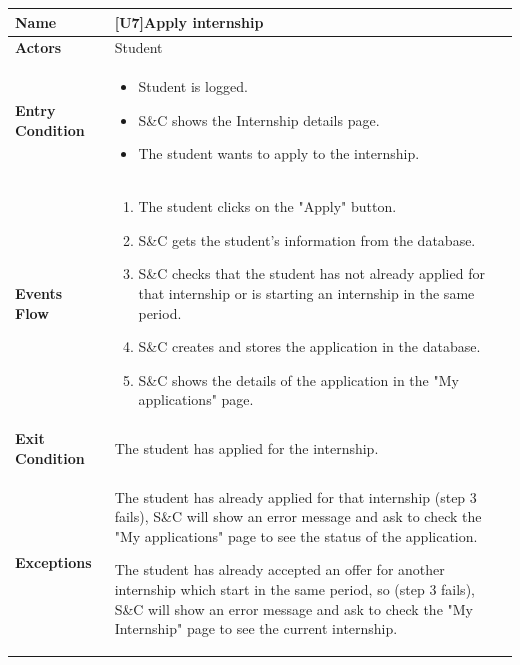 \begin{center}
    \begin{tabular}{|p{9em}|p{27em}|}
        \hline
        \rowcolor{bluepoli!40}
        \textbf{Name} & \textbf{[U7]Apply internship} \\
        \hline
        \textbf{Actors} & Student \\
        \hline
        \textbf{Entry Condition} & 
        \begin{itemize}
            \item Student is logged.
            \item S\&C shows the Internship details page.
            \item The student wants to apply to the internship.
        \end{itemize} \\
        \hline
        \textbf{Events Flow} & 
        \begin{enumerate}
            \item The student clicks on the "Apply" button.
            \item S\&C gets the student's information from the database.
            \item S\&C checks that the student has not already applied for that internship or is starting an internship in the same period.
            \item S\&C creates and stores the application in the database.
            \item S\&C shows the details of the application in the "My applications" page.
        \end{enumerate} \\
        \hline
        \textbf{Exit Condition} & The student has applied for the internship. \\
        \hline
        \textbf{Exceptions} & The student has already applied for that internship (step 3 fails), S\&C will show an error message and ask to
        check the "My applications" page to see the status of the application. 
        
        The student has already accepted an offer for another internship which start in the same period, so (step 3 fails), S\&C will show an 
        error message and ask to check the "My Internship" page to see the current internship.\\
        \hline
    \end{tabular}
\end{center}


